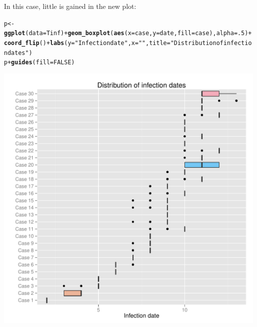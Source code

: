 \documentclass{article}\usepackage[]{graphicx}\usepackage[]{color}
\makeatletter
\newcommand{\hlnum}[1]{\textcolor[rgb]{0.686,0.059,0.569}{#1}}%
\newcommand{\hlstr}[1]{\textcolor[rgb]{0.192,0.494,0.8}{#1}}%
\newcommand{\hlopt}[1]{\textcolor[rgb]{0,0,0}{#1}}%
\newcommand{\hlstd}[1]{\textcolor[rgb]{0.345,0.345,0.345}{#1}}%
\newcommand{\hlkwb}[1]{\textcolor[rgb]{0.69,0.353,0.396}{#1}}%
\newcommand{\hlkwc}[1]{\textcolor[rgb]{0.333,0.667,0.333}{#1}}%
\newcommand{\hlkwd}[1]{\textcolor[rgb]{0.737,0.353,0.396}{\textbf{#1}}}%
\newenvironment{kframe}{%
 \def\at@end@of@kframe{}%
 \ifinner\ifhmode%
  \def\at@end@of@kframe{\end{minipage}}%
  \begin{minipage}{\columnwidth}%
 \fi\fi%
 \def\FrameCommand##1{\hskip\@totalleftmargin \hskip-\fboxsep
 \colorbox{shadecolor}{##1}\hskip-\fboxsep
     \hskip-\linewidth \hskip-\@totalleftmargin \hskip\columnwidth}%
 \MakeFramed {\advance\hsize-\width
   \@totalleftmargin\z@ \linewidth\hsize
   \@setminipage}}%
 {\par\unskip\endMakeFramed%
 \at@end@of@kframe}
\newenvironment{knitrout}{}{} %
\makeatother
\begin{document}
In this case, little is gained in the new plot:
\begin{knitrout}
\color{fgcolor}\begin{kframe}
\begin{alltt}
\hlstd{p} \hlkwb{<-} \hlkwd{ggplot}\hlstd{(}\hlkwc{data}\hlstd{=Tinf)} \hlopt{+} \hlkwd{geom_boxplot}\hlstd{(}\hlkwd{aes}\hlstd{(}\hlkwc{x}\hlstd{=case,}\hlkwc{y}\hlstd{=date,}\hlkwc{fill}\hlstd{=case),} \hlkwc{alpha}\hlstd{=}\hlnum{.5}\hlstd{)} \hlopt{+}
   \hlkwd{coord_flip}\hlstd{()} \hlopt{+} \hlkwd{labs}\hlstd{(}\hlkwc{y}\hlstd{=}\hlstr{"Infection date"}\hlstd{,} \hlkwc{x}\hlstd{=}\hlstr{""}\hlstd{,} \hlkwc{title}\hlstd{=}\hlstr{"Distribution of infection dates"}\hlstd{)}
\hlstd{p} \hlopt{+} \hlkwd{guides}\hlstd{(}\hlkwc{fill}\hlstd{=}\hlnum{FALSE}\hlstd{)}
\end{alltt}
\end{kframe}

{\centering \includegraphics[width=.6\textwidth]{figs/unnamed-chunk-32} 

}



\end{knitrout}
\end{document}
